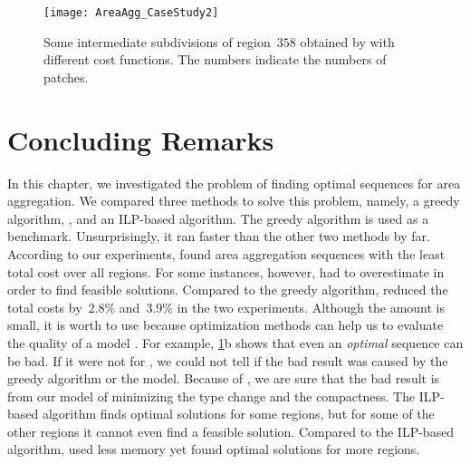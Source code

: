\begin{figure}[h!tb]
\centering
\texttt{[image: AreaAgg\_CaseStudy2]}
\caption{Some intermediate subdivisions of region~$358$ 
	obtained by \Astar with different cost functions.
	The numbers indicate the numbers of patches.
}
\label{fig:AreaAgg_CaseStudy2_Rg358}
\end{figure}



\section{Concluding Remarks}
\label{sec:AreaAgg_Conclusions}
In this chapter, we investigated the problem of 
finding optimal sequences for area aggregation.
We compared three methods to solve this problem, namely, 
a greedy algorithm, \Astar, and an ILP-based algorithm.
The greedy algorithm is used as a benchmark.
Unsurprisingly, it ran faster than the other two methods by far.
According to our experiments, \Astar found area aggregation 
sequences
with the least total cost over all regions.
For some instances, however, \Astar had to overestimate
in order to find feasible solutions.
Compared to the greedy algorithm, 
\Astar reduced the total costs by~$2.8\%$ and~$3.9\%$
in the two experiments.
Although the amount is small, it is worth to use \Astar
because optimization methods can help us 
to evaluate the quality of a model 
\parencite{Haunert2017Label,Haunert2008Assuring,Haunert2016Optimization}.
For example, \fig\ref{fig:AreaAgg_CaseStudy2_Rg358}b shows that
even an \emph{optimal} sequence can be bad.
If it were not for \Astar, 
we could not tell if the bad result was caused 
by the greedy algorithm or the model.
Because of \Astar, we are sure that the bad result is from
our model of minimizing the 
type change and the compactness.
The ILP-based algorithm finds optimal solutions for some regions,
but for some of the other regions 
it cannot even find a feasible solution.
Compared to the ILP-based algorithm,
\Astar used less memory 
yet found optimal solutions for more regions.


